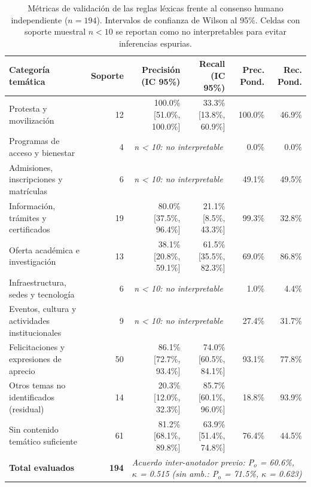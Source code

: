 \begin{table}[htbp]
\centering
\small
\caption{Métricas de validación de las reglas léxicas frente al consenso humano independiente ($n = 194$). Intervalos de confianza de Wilson al 95\%. Celdas con soporte muestral $n < 10$ se reportan como no interpretables para evitar inferencias espurias.}
\label{tab:evaluacion_reglas_tematicas}
\begin{tabular}{lrrrrr}
\toprule
\textbf{Categoría temática} & \textbf{Soporte} & \textbf{Precisión (IC 95\%)} & \textbf{Recall (IC 95\%)} & \textbf{Prec. Pond.} & \textbf{Rec. Pond.} \\
\midrule
Protesta y movilización & 12 & 100.0\% [51.0\%, 100.0\%] & 33.3\% [13.8\%, 60.9\%] & 100.0\% & 46.9\% \\
Programas de acceso y bienestar & 4 & \multicolumn{2}{c}{\textit{n < 10: no interpretable}} & 0.0\% & 0.0\% \\
Admisiones, inscripciones y matrículas & 6 & \multicolumn{2}{c}{\textit{n < 10: no interpretable}} & 49.1\% & 49.5\% \\
Información, trámites y certificados & 19 & 80.0\% [37.5\%, 96.4\%] & 21.1\% [8.5\%, 43.3\%] & 99.3\% & 32.8\% \\
Oferta académica e investigación & 13 & 38.1\% [20.8\%, 59.1\%] & 61.5\% [35.5\%, 82.3\%] & 69.0\% & 86.8\% \\
Infraestructura, sedes y tecnología & 6 & \multicolumn{2}{c}{\textit{n < 10: no interpretable}} & 1.0\% & 4.4\% \\
Eventos, cultura y actividades institucionales & 9 & \multicolumn{2}{c}{\textit{n < 10: no interpretable}} & 27.4\% & 31.7\% \\
Felicitaciones y expresiones de aprecio & 50 & 86.1\% [72.7\%, 93.4\%] & 74.0\% [60.5\%, 84.1\%] & 93.1\% & 77.8\% \\
\midrule
Otros temas no identificados (residual) & 14 & 20.3\% [12.0\%, 32.3\%] & 85.7\% [60.1\%, 96.0\%] & 18.8\% & 93.9\% \\
Sin contenido temático suficiente & 61 & 81.2\% [68.1\%, 89.8\%] & 63.9\% [51.4\%, 74.8\%] & 76.4\% & 44.5\% \\
\midrule
\textbf{Total evaluados} & \textbf{194} & \multicolumn{4}{l}{\textit{Acuerdo inter-anotador previo: P$_o$ = 60.6\%, $\kappa$ = 0.515 (sin amb.: P$_o$ = 71.5\%, $\kappa$ = 0.623)}} \\
\bottomrule
\end{tabular}
\end{table}
